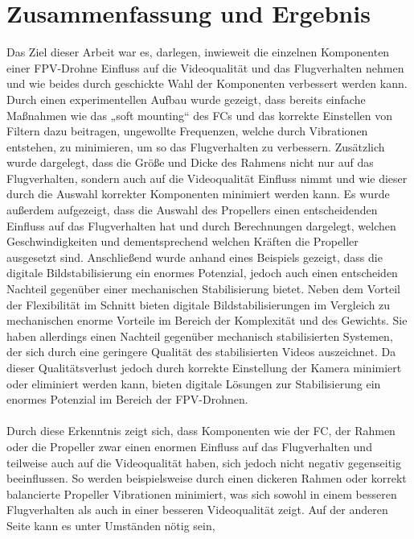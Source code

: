
\section[Zusammenfassung und Ergebnis]{Zusammenfassung und Ergebnis}
Das Ziel dieser Arbeit war es, darlegen, inwieweit die einzelnen Komponenten einer FPV-Drohne
Einfluss auf die Videoqualität und das Flugverhalten nehmen und wie beides durch geschickte Wahl
der Komponenten verbessert werden kann. Durch einen experimentellen Aufbau wurde gezeigt, dass
bereits einfache Maßnahmen wie das „soft mounting“ des FCs und das korrekte Einstellen von Filtern
dazu beitragen, ungewollte Frequenzen, welche durch Vibrationen entstehen, zu minimieren, um so
das Flugverhalten zu verbessern. Zusätzlich wurde dargelegt, dass die Größe und Dicke des Rahmens
nicht nur auf das Flugverhalten, sondern auch auf die Videoqualität Einfluss nimmt und wie dieser
durch die Auswahl korrekter Komponenten minimiert werden kann. Es wurde außerdem aufgezeigt, dass
die Auswahl des Propellers einen entscheidenden Einfluss auf das Flugverhalten hat und durch
Berechnungen dargelegt, welchen Geschwindigkeiten und dementsprechend welchen Kräften die Propeller
ausgesetzt sind. Anschließend wurde anhand eines Beispiels gezeigt, dass die digitale
Bildstabilisierung ein enormes Potenzial, jedoch auch einen entscheiden Nachteil gegenüber einer
mechanischen Stabilisierung bietet. Neben dem Vorteil der Flexibilität im Schnitt bieten digitale
Bildstabilisierungen im Vergleich zu mechanischen enorme Vorteile im Bereich der Komplexität und
des Gewichts. Sie haben allerdings einen Nachteil gegenüber mechanisch stabilisierten Systemen,
der sich durch eine geringere Qualität des stabilisierten Videos auszeichnet. Da dieser Qualitätsverlust
jedoch durch korrekte Einstellung der Kamera minimiert oder eliminiert werden kann, bieten digitale
Lösungen zur Stabilisierung ein enormes Potenzial im Bereich der FPV-Drohnen. \\
\\
Durch diese Erkenntnis zeigt sich, dass Komponenten wie der FC, der Rahmen oder die Propeller zwar
einen enormen Einfluss auf das Flugverhalten und teilweise auch auf die Videoqualität haben, sich
jedoch nicht negativ gegenseitig beeinflussen. So werden beispielsweise durch einen dickeren Rahmen
oder korrekt balancierte Propeller Vibrationen minimiert, was sich sowohl in einem besseren Flugverhalten
als auch in einer besseren Videoqualität zeigt. Auf der anderen Seite kann es unter Umständen nötig sein,
